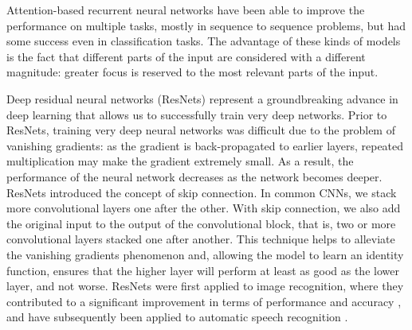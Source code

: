 Attention-based recurrent neural networks \cite{11, 12} have been able to improve the performance on multiple tasks, mostly in sequence to sequence problems, but had some success even in classification tasks. The advantage of these kinds of models is the fact that different parts of the input are considered with a different magnitude: greater focus is reserved to the most relevant parts of the input.


Deep residual neural networks (ResNets) \cite{9} represent a groundbreaking advance in deep learning that allows us to successfully train very deep networks.
Prior to ResNets, training very deep neural networks was difficult due to the problem of vanishing gradients: as the gradient is back-propagated to earlier layers, repeated multiplication may make the gradient extremely small.
As a result, the performance of the neural network decreases as the network becomes deeper.
ResNets introduced the concept of skip connection.  In common CNNs, we stack more convolutional layers one after the other. With skip connection, we also add the original input to the output of the convolutional block, that is, two or more convolutional layers stacked one after another.
This technique helps to alleviate the vanishing gradients phenomenon and, allowing the model to learn an identity function, ensures that the higher layer will perform at least as good as the lower layer, and not worse.
ResNets were first applied to image recognition, where they contributed to a significant improvement in terms of performance and accuracy \cite{9}, and have subsequently been applied to automatic speech recognition \cite{13}.

